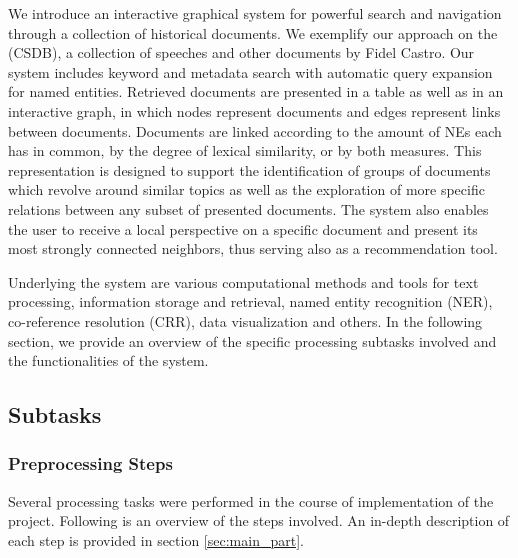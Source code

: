 We introduce an interactive graphical system for powerful search and navigation through a collection of historical documents. 
We exemplify our approach on the  (CSDB), a collection of
speeches and other documents by Fidel Castro. Our system includes keyword and metadata search with automatic query 
expansion for named entities. 
Retrieved documents are presented in a table as well as in an interactive graph, in which nodes represent 
documents and edges represent links between documents. Documents are linked according to the amount of NEs each has in common, by the degree of lexical
similarity, or by both measures. This representation is designed to support the identification of groups of documents which revolve around similar topics as well as the exploration of more specific relations between any subset of presented documents. The system also enables the user to receive a local perspective on a 
specific document and present its most strongly connected neighbors, thus serving also as a recommendation tool. 

Underlying the system are various computational methods and tools for text processing, 
information storage and retrieval, named entity recognition (NER), co-reference resolution (CRR), 
data visualization and others. In the following section, we provide an overview of the specific processing subtasks involved and the functionalities of the system.

\subsection{Subtasks}
\label{sec:subtasks}
\subsubsection{Preprocessing Steps}

Several processing tasks were performed in the course of implementation of the project. Following is an overview of the steps involved. An in-depth description of each step is provided in section \ref{sec:main_part}.


